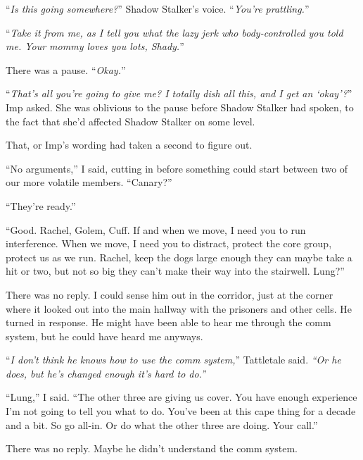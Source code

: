 ``\emph{Is this going somewhere?}''  Shadow Stalker's voice.  ``\emph{You're prattling.}''



``\emph{Take it from me, as I tell you what the lazy jerk who body-controlled you told me.  Your mommy loves you lots, Shady.}''



There was a pause.  ``\emph{Okay.}''



``\emph{That's all you're going to give me?  I totally dish all this, and I get an `okay'?}''  Imp asked.  She was oblivious to the pause before Shadow Stalker had spoken, to the fact that she'd affected Shadow Stalker on some level.



That, or Imp's wording had taken a second to figure out.



``No arguments,'' I said, cutting in before something could start between two of our more volatile members.  ``Canary?''



``They're ready.''



``Good.  Rachel, Golem, Cuff.  If and when we move, I need you to run interference.  When we move, I need you to distract, protect the core group, protect us as we run.  Rachel, keep the dogs large enough they can maybe take a hit or two, but not so big they can't make their way into the stairwell.  Lung?''



There was no reply.  I could sense him out in the corridor, just at the corner where it looked out into the main hallway with the prisoners and other cells.  He turned in response.  He might have been able to hear me through the comm system, but he could have heard me anyways.



``\emph{I don't think he knows how to use the comm system,}'' Tattletale said.  \emph{``Or he does, but he's changed enough it's hard to do.''}



``Lung,'' I said.  ``The other three are giving us cover.  You have enough experience I'm not going to tell you what to do.  You've been at this cape thing for a decade and a bit.  So go all-in.  Or do what the other three are doing.  Your call.''



There was no reply.  Maybe he didn't understand the comm system.



